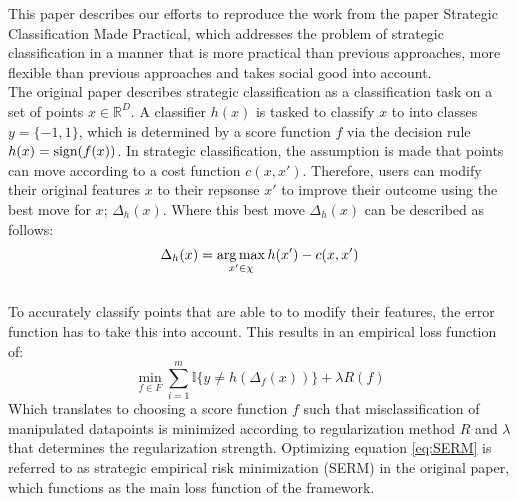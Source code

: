 

This paper describes our efforts to reproduce the work from the paper Strategic Classification Made Practical\cite{levanon2021strategic}, which addresses the problem of strategic classification in a manner that is more practical than previous approaches, more flexible than previous approaches and takes social good into account.\\
The original paper describes strategic classification as a classification task on a set of points $x \in \mathbb{R}^D$. A classifier $h(x)$ is tasked to classify $x$ to into classes $y = \{-1,1\}$, which is determined by a score function $f$ via the decision rule $h(x) = \operatorname{sign}(f(x))$. In strategic classification, the assumption is made that points can move according to a cost function $c(x,x')$. Therefore, users can modify their original features $x$ to their repsonse $x'$ to improve their outcome using the best move for $x$; $\Delta_h(x)$. Where this best move $\Delta_h(x)$ can be described as follows: 
\begin{equation} \label{eq:resp_map}
  \Delta_h(x) = \operatorname*{arg\,max}_{x' \in \chi} h(x') - c(x,x') 
\end{equation}\\
To accurately classify points that are able to to modify their features, the error function has to take this into account. This results in an empirical loss function of: 
\begin{equation} \label{eq:SERM}
 \min_{f \in F} \sum^m_{i=1} \mathds{I}\{y \neq h(\Delta_f(x))\} + \lambda R(f)
\end{equation}
Which translates to choosing a score function $f$ such that misclassification of manipulated datapoints is minimized according to regularization method $R$ and $\lambda$ that determines the regularization strength. Optimizing equation \ref{eq:SERM} is referred to as strategic empirical risk minimization (SERM) in the original paper, which functions as the main loss function of the framework.
